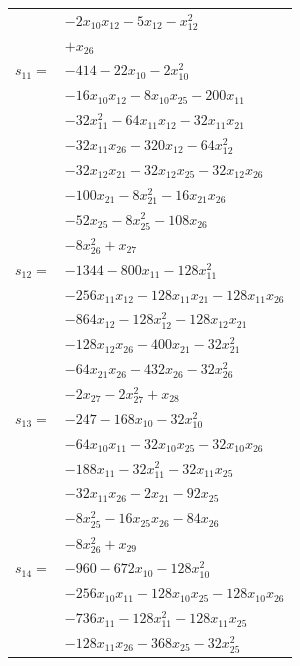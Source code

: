 \begin{longtable}{@{}r@{\;}l@{}}
 & \(\displaystyle -2x_{10}x_{12} -5x_{12} -x_{12}^{2}\) \\
 & \(\displaystyle +x_{26}\) \\[3pt]
\(s_{11}=\) & \(\displaystyle -414 -22x_{10} -2x_{10}^{2}\) \\
 & \(\displaystyle -16x_{10}x_{12} -8x_{10}x_{25} -200x_{11}\) \\
 & \(\displaystyle -32x_{11}^{2} -64x_{11}x_{12} -32x_{11}x_{21}\) \\
 & \(\displaystyle -32x_{11}x_{26} -320x_{12} -64x_{12}^{2}\) \\
 & \(\displaystyle -32x_{12}x_{21} -32x_{12}x_{25} -32x_{12}x_{26}\) \\
 & \(\displaystyle -100x_{21} -8x_{21}^{2} -16x_{21}x_{26}\) \\
 & \(\displaystyle -52x_{25} -8x_{25}^{2} -108x_{26}\) \\
 & \(\displaystyle -8x_{26}^{2} +x_{27}\) \\[3pt]
\(s_{12}=\) & \(\displaystyle -1344 -800x_{11} -128x_{11}^{2}\) \\
 & \(\displaystyle -256x_{11}x_{12} -128x_{11}x_{21} -128x_{11}x_{26}\) \\
 & \(\displaystyle -864x_{12} -128x_{12}^{2} -128x_{12}x_{21}\) \\
 & \(\displaystyle -128x_{12}x_{26} -400x_{21} -32x_{21}^{2}\) \\
 & \(\displaystyle -64x_{21}x_{26} -432x_{26} -32x_{26}^{2}\) \\
 & \(\displaystyle -2x_{27} -2x_{27}^{2} +x_{28}\) \\[3pt]
\(s_{13}=\) & \(\displaystyle -247 -168x_{10} -32x_{10}^{2}\) \\
 & \(\displaystyle -64x_{10}x_{11} -32x_{10}x_{25} -32x_{10}x_{26}\) \\
 & \(\displaystyle -188x_{11} -32x_{11}^{2} -32x_{11}x_{25}\) \\
 & \(\displaystyle -32x_{11}x_{26} -2x_{21} -92x_{25}\) \\
 & \(\displaystyle -8x_{25}^{2} -16x_{25}x_{26} -84x_{26}\) \\
 & \(\displaystyle -8x_{26}^{2} +x_{29}\) \\[3pt]
\(s_{14}=\) & \(\displaystyle -960 -672x_{10} -128x_{10}^{2}\) \\
 & \(\displaystyle -256x_{10}x_{11} -128x_{10}x_{25} -128x_{10}x_{26}\) \\
 & \(\displaystyle -736x_{11} -128x_{11}^{2} -128x_{11}x_{25}\) \\
 & \(\displaystyle -128x_{11}x_{26} -368x_{25} -32x_{25}^{2}\) \\

\end{longtable}
